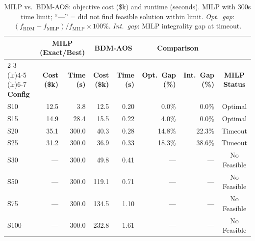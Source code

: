 \begin{table}[t]
\centering
\caption{MILP vs.\ BDM-AOS: objective cost (\$k) and runtime (seconds). MILP with 300s time limit; ``---'' = did not find feasible solution within limit. \emph{Opt.\ gap}: $(f_{\text{BDM}} - f_{\text{MILP}}) / f_{\text{MILP}} \times 100\%$. \emph{Int.\ gap}: MILP integrality gap at timeout.}
\label{tab:milp_comparison}
\small
\setlength{\tabcolsep}{4.5pt}
\begin{tabular}{l rr rr rr c}
\toprule
 & \multicolumn{2}{c}{\textbf{MILP (Exact/Best)}} & \multicolumn{2}{c}{\textbf{BDM-AOS}} & \multicolumn{2}{c}{\textbf{Comparison}} & \\
\cmidrule(lr){2-3} \cmidrule(lr){4-5} \cmidrule(lr){6-7}
\textbf{Config} & \textbf{Cost (\$k)} & \textbf{Time (s)} & \textbf{Cost (\$k)} & \textbf{Time (s)} & \textbf{Opt.\ Gap (\%)} & \textbf{Int.\ Gap (\%)} & \textbf{MILP Status} \\
\midrule
S10  & 12.5  & 3.8   & 12.5  & 0.20  & 0.0\%  & 0.0\%  & Optimal \\
S15  & 14.9  & 28.4  & 15.5  & 0.22  & 4.0\%  & 0.0\%  & Optimal \\
S20  & 35.1  & 300.0 & 40.3  & 0.28  & 14.8\% & 22.3\% & Timeout \\
S25  & 31.2  & 300.0 & 36.9  & 0.33  & 18.3\% & 38.6\% & Timeout \\
S30  & ---   & 300.0 & 49.8  & 0.41  & ---    & ---    & No Feasible \\
S50  & ---   & 300.0 & 119.1 & 0.71  & ---    & ---    & No Feasible \\
S75  & ---   & 300.0 & 134.5 & 1.10  & ---    & ---    & No Feasible \\
S100 & ---   & 300.0 & 232.8 & 1.61  & ---    & ---    & No Feasible \\
\bottomrule
\end{tabular}
\end{table}

